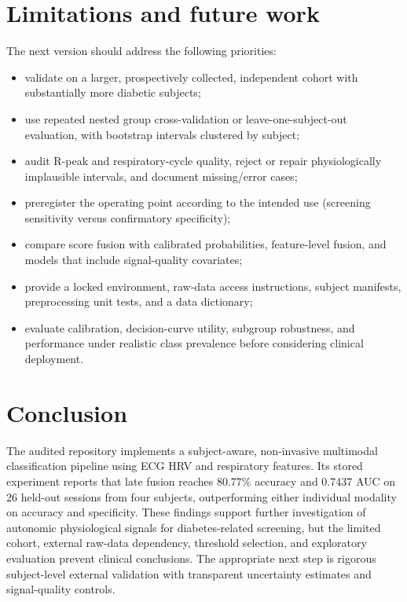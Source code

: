 \documentclass[11pt,a4paper]{article}
\begin{document}
\section{Limitations and future work}
The next version should address the following priorities:
\begin{itemize}
  \item validate on a larger, prospectively collected, independent cohort with substantially more diabetic subjects;
  \item use repeated nested group cross-validation or leave-one-subject-out evaluation, with bootstrap intervals clustered by subject;
  \item audit R-peak and respiratory-cycle quality, reject or repair physiologically implausible intervals, and document missing/error cases;
  \item preregister the operating point according to the intended use (screening sensitivity versus confirmatory specificity);
  \item compare score fusion with calibrated probabilities, feature-level fusion, and models that include signal-quality covariates;
  \item provide a locked environment, raw-data access instructions, subject manifests, preprocessing unit tests, and a data dictionary;
  \item evaluate calibration, decision-curve utility, subgroup robustness, and performance under realistic class prevalence before considering clinical deployment.
\end{itemize}

\section{Conclusion}
The audited repository implements a subject-aware, non-invasive multimodal classification pipeline using ECG HRV and respiratory features. Its stored experiment reports that late fusion reaches 80.77\% accuracy and 0.7437 AUC on 26 held-out sessions from four subjects, outperforming either individual modality on accuracy and specificity. These findings support further investigation of autonomic physiological signals for diabetes-related screening, but the limited cohort, external raw-data dependency, threshold selection, and exploratory evaluation prevent clinical conclusions. The appropriate next step is rigorous subject-level external validation with transparent uncertainty estimates and signal-quality controls.
\end{document}
